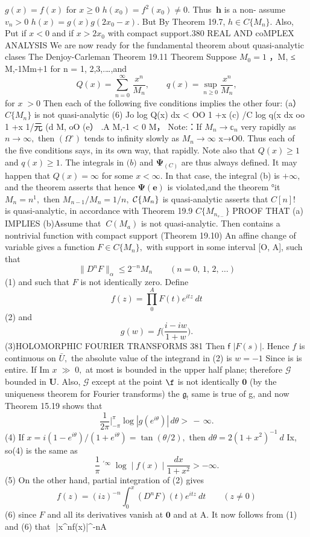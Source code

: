 $g(x)=f(x)$ for $x\geq0$ $h(x_{0})=f^{2}(x_{0})\neq0.$ Thus $\ \boldsymbol{h}$ is a non- assume $v_{n}>0$ $h(x)=g(x)g(2x_{0}-x).$ But By Theorem 19.7, $h\in C\{M_{n}\}.$ Also, Put if $x<0$ and if $x>2x_{0}$ with compact support.380 REAL AND coMPLEX ANALYSIS We are now ready for the fundamental theorem about quasi-analytic clases The Denjoy-Carleman Theorem 19.11 Theorem Suppose $M_{0}=1$ ，M, ≤ M,-1Mm+1 for n = 1, 2,3,.…,and $$ Q(x)=\sum_{n=0}^{\infty}\,{\frac{x^{n}}{M_{n}}},\qquad q(x)=\operatorname*{sup}_{n\geq0}{\frac{x^{n}}{M_{n}}}, $$ for $\scriptstyle x\;>0$ Then each of the following five conditions implies the other four: (a） $C\{M_{n}\}$ is not quasi-analytic (6) Jo log Q(x) dx < OO 1 +x (c) /C log q(x dx oo 1 +x 1/元 (d M, oO (e） .A M,-1 < 0 M， Note:：If $M_{n}\to\mathbb{c}_{n}$ very rapidly as $n\to\infty,$ then $\scriptstyle(\Omega^{\circ})$ tends to infinity slowly as $M_{n}\to\infty$ x→O0. Thus each of the five conditions says, in its own way, that rapidly. Note also that $Q(x)\geq1$ and $q(x)\geq1.$ The integrals in $\mathbf{(}b\mathbf{)}$ and $\mathbf{\Psi}_{(C)}$ are thus always defined. It may happen that $Q(x)=\infty$ for some $x<\infty.$ In that case, the integral (b) is $\scriptstyle+\infty,$ and the theorem asserts that hence $\mathbf{\Psi}({\boldsymbol{e}})$ is violated,and the theorem °it $M_{n}=n^{1},$ then $M_{n-1}/M_{n}=1/n,$ ${\cal C}\{M_{n}\}$ is quasi-analytic asserts that $\scriptstyle C[n]!\quad$ is quasi-analytic, in accordance with Theorem 19.9 $C\{M_{n_{s-}}\}$ PROOF THAT (a) IMPLIES (b)Assume that $\ C(M_{a})$ is not quasi-analytic. Then contains a nontrivial function with compact support (Theorem 19.10) An affine change of variable gives a function $F\in C\{M_{n}\},$ with support in some interval [O, A], such that $$ \|D^{n}F\|_{\alpha}\leq2^{-n}M_{n}\qquad(n=0,\,1,\,2,\,\ldots) $$ (1) and such that ${\mathbf{}}F$ is not identically zero. Define $$ f(z)=\prod_{0}^{A}F(t)e^{i t z}~d t $$ (2) and $$ g(w)=f{\biggl(}{\frac{i-i w}{1+w}}{\biggr)}. $$ (3)HOLOMORPHIC FOURIER TRANSFORMS 381 Then $\boldsymbol{\mathsf{f}}$ $|F(s)|.$ Hence $\boldsymbol{\mathit{f}}$ is continuous on ${\bar{U}},$ the absolute value of the integrand in (2) is $w=-1$ Since is is entire. If Im $\scriptstyle x\;\gg\;0,$ at most is bounded in the upper half plane; therefore $\scriptstyle{\mathcal{G}}$ bounded in ${\boldsymbol{U}}.$ Also, $\scriptstyle{\mathcal{G}}$ except at the point $\boldsymbol{\f}$ is not identically $\mathbf{0}$ (by the uniqueness theorem for Fourier transforms) the ${\mathfrak{g}}_{!}$ same is true of g, and now Theorem 15.19 shows that $$ \frac{1}{2\pi}\left.\right|_{-\pi}^{\pi}\log\left|g(e^{i\theta})\right|\,d\theta>\,-\,\infty. $$ (4) If $x=i(1-e^{i\theta})/(1+e^{i\theta})=\tan\left(\theta/2\right),$ then $d\theta=2(1+x^{2})^{-1}~d$ Ix, so(4) is the same as $$ {\frac{1}{\pi}}\mathop{\bigcup_{-\infty}}^{\prime\infty}\log\mid f(x)\mid{\frac{d x}{1+x^{2}}}>-\infty. $$ (5) On the other hand, partial integration of (2) gives $$ f(z)=(i z)^{-n}\displaystyle\int_{0}^{x}(D^{n}F)(t)e^{i t z}~d t\qquad(z\neq0) $$ (6) since ${\mathbf{}}F$ and all its derivatives vanish at $\mathbf{0}$ and at A. It now follows from (1) and (6) that $$ |x^{n}f(x)|^{-n}A 